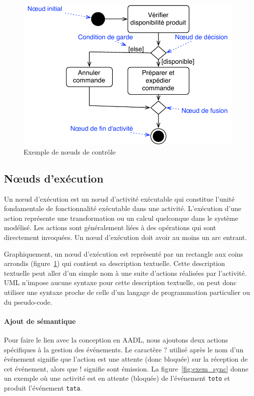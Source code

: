 \documentclass[11pt,a4paper]{paper}
\begin{document}
\begin{appendices}
 \begin{figure}[htbp]
\begin{center}
\includegraphics[scale=0.6]{figures_pdf/exe_act}
\caption{Exemple de n{\oe}uds de contrôle}
\label{fig:exe_act}
\end{center}
\end{figure}
\FloatBarrier

\subsection{N{\oe}uds d'exécution}

Un n{\oe}ud d'exécution est un n{\oe}ud d'activité exécutable qui constitue l'unité fondamentale de fonctionnalité exécutable dans une activité. L'exécution d'une action représente une transformation ou un calcul quelconque dans le système modélisé. Les actions sont généralement liées à des opérations qui sont directement invoquées. Un n{\oe}ud d'exécution doit avoir au moins un arc entrant.

Graphiquement, un n{\oe}ud d'exécution est représenté par un rectangle aux coins arrondis (figure~\ref{fig:exe_act}) qui contient sa description textuelle. Cette description textuelle peut aller d'un simple nom à une suite d'actions réalisées par l'activité. UML n'impose aucune syntaxe pour cette description textuelle, on peut donc utiliser une syntaxe proche de celle d'un langage de programmation particulier ou du pseudo-code.


\paragraph{Ajout de sémantique}
Pour faire le lien avec la conception en AADL, nous ajoutons deux actions spécifiques à la gestion des événements. Le caractère \og ? \fg utilisé après le nom d'un événement signifie que l'action est une attente (donc bloquée) sur la réception de cet événement, alors que \og ! \fg signifie sont émission. La figure~\ref{fig:exem_sync} donne un exemple où une activité est en attente (bloquée) de l'événement \texttt{toto} et produit l'événement \texttt{tata}.


\end{appendices}
\end{document}
